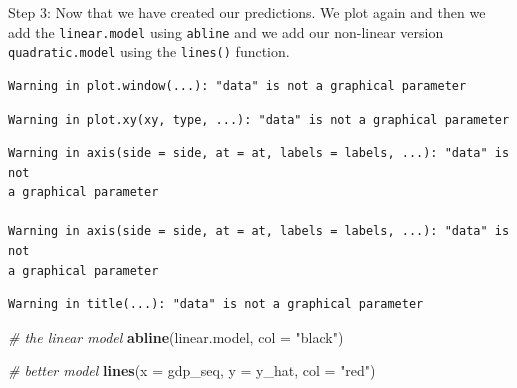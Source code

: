 \documentclass[]{article}
\newenvironment{Shaded}{\begin{snugshade}}{\end{snugshade}}
\newcommand{\CommentTok}[1]{\textcolor[rgb]{0.56,0.35,0.01}{\textit{#1}}}
\newcommand{\DataTypeTok}[1]{\textcolor[rgb]{0.13,0.29,0.53}{#1}}
\newcommand{\DecValTok}[1]{\textcolor[rgb]{0.00,0.00,0.81}{#1}}
\newcommand{\KeywordTok}[1]{\textcolor[rgb]{0.13,0.29,0.53}{\textbf{#1}}}
\newcommand{\NormalTok}[1]{#1}
\newcommand{\OperatorTok}[1]{\textcolor[rgb]{0.81,0.36,0.00}{\textbf{#1}}}
\newcommand{\OtherTok}[1]{\textcolor[rgb]{0.56,0.35,0.01}{#1}}
\newcommand{\StringTok}[1]{\textcolor[rgb]{0.31,0.60,0.02}{#1}}
\begin{document}
Step 3: Now that we have created our predictions. We plot again and then we add the \texttt{linear.model} using \texttt{abline} and we add our non-linear version \texttt{quadratic.model} using the \texttt{lines()} function.

\begin{Shaded}
\end{Shaded}

\begin{verbatim}
Warning in plot.window(...): "data" is not a graphical parameter
\end{verbatim}

\begin{verbatim}
Warning in plot.xy(xy, type, ...): "data" is not a graphical parameter
\end{verbatim}

\begin{verbatim}
Warning in axis(side = side, at = at, labels = labels, ...): "data" is not
a graphical parameter

Warning in axis(side = side, at = at, labels = labels, ...): "data" is not
a graphical parameter
\end{verbatim}

\begin{verbatim}
Warning in title(...): "data" is not a graphical parameter
\end{verbatim}

\begin{Shaded}
\begin{Highlighting}[]
\CommentTok{# the linear model}
\KeywordTok{abline}\NormalTok{(linear.model, }\DataTypeTok{col =} \StringTok{"black"}\NormalTok{)}

\CommentTok{# better model}
\KeywordTok{lines}\NormalTok{(}\DataTypeTok{x =}\NormalTok{ gdp_seq, }\DataTypeTok{y =}\NormalTok{ y_hat, }\DataTypeTok{col =} \StringTok{"red"}\NormalTok{)}
\end{Highlighting}
\end{Shaded}
\end{document}
